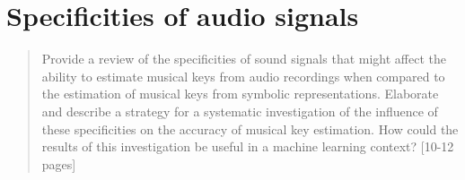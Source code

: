 \chapter{Specificities of audio signals}
\label{chap:chap40}

\begin{quote}
    Provide a review of the specificities of sound signals that might affect the ability to estimate musical keys from audio recordings when compared to the estimation of musical keys from symbolic representations. Elaborate and describe a strategy for a systematic investigation of the influence of these specificities on the accuracy of musical key estimation. How could the results of this investigation be useful in a machine learning context? [10-12 pages]
\end{quote}
\clearpage


